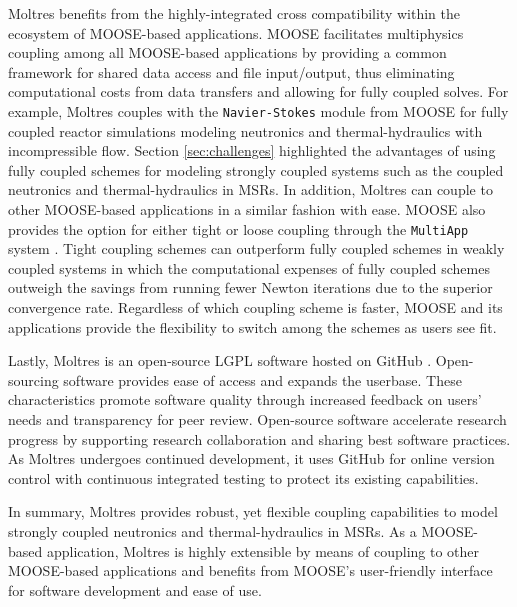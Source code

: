 Moltres benefits from the highly-integrated cross compatibility within the
ecosystem of MOOSE-based applications. MOOSE facilitates multiphysics coupling
among all MOOSE-based applications by providing a common framework for shared
data access and file input/output, thus eliminating computational costs from
data transfers and allowing for fully coupled solves. For example, Moltres
couples with the \texttt{Navier-Stokes} module \cite{peterson_overview_2018}
from MOOSE for fully coupled reactor simulations modeling neutronics and
thermal-hydraulics with incompressible flow. Section
\ref{sec:challenges} highlighted the advantages of using fully coupled schemes
for modeling strongly coupled systems such as the coupled
neutronics and thermal-hydraulics in \glspl{MSR}. In addition, Moltres can
couple to other MOOSE-based applications in a similar fashion with ease. MOOSE
also provides the option for either tight or loose coupling through the
\texttt{MultiApp} system \cite{gaston_physics-based_2015}. Tight coupling
schemes can outperform
fully coupled schemes in weakly coupled systems in which the computational
expenses of fully coupled schemes outweigh the savings from running fewer
Newton iterations due to the superior convergence rate. Regardless of which
coupling scheme is faster, MOOSE and its applications provide the flexibility
to switch among the schemes as users see fit.

Lastly, Moltres is an open-source \gls{LGPL} software hosted on
GitHub \cite{github_build_2017}. Open-sourcing software provides ease of access
and expands the userbase. These characteristics promote software quality
through increased feedback on users' needs and transparency for peer review.
Open-source software accelerate research progress by supporting research
collaboration and sharing best software practices. As Moltres undergoes
continued development, it uses GitHub for online version control with
continuous integrated testing to protect its existing capabilities.

In summary, Moltres provides robust, yet flexible coupling capabilities to
model strongly coupled neutronics and thermal-hydraulics in \glspl{MSR}. As a
MOOSE-based application, Moltres is highly extensible by means of coupling to
other MOOSE-based applications and benefits from MOOSE's user-friendly
interface for software development and ease of use.
